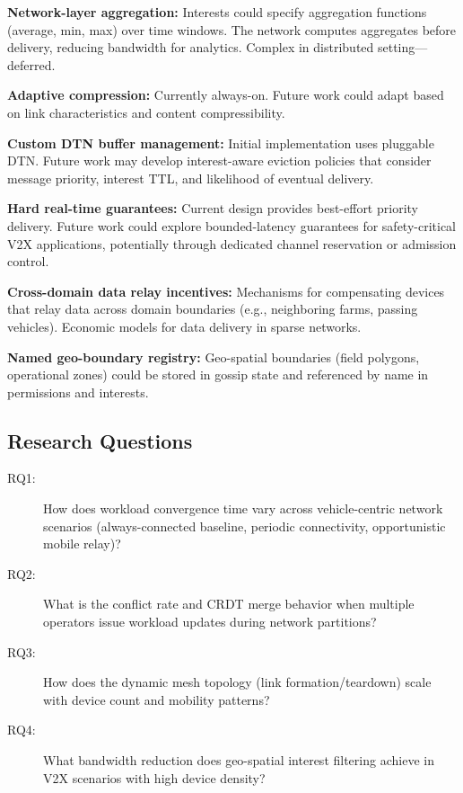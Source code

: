 \textbf{Network-layer aggregation:} Interests could specify aggregation functions (average, min, max) over time windows. The network computes aggregates before delivery, reducing bandwidth for analytics. Complex in distributed setting---deferred.

\textbf{Adaptive compression:} Currently always-on. Future work could adapt based on link characteristics and content compressibility.

\textbf{Custom DTN buffer management:} Initial implementation uses pluggable DTN. Future work may develop interest-aware eviction policies that consider message priority, interest TTL, and likelihood of eventual delivery.

\textbf{Hard real-time guarantees:} Current design provides best-effort priority delivery. Future work could explore bounded-latency guarantees for safety-critical V2X applications, potentially through dedicated channel reservation or admission control.

\textbf{Cross-domain data relay incentives:} Mechanisms for compensating devices that relay data across domain boundaries (e.g., neighboring farms, passing vehicles). Economic models for data delivery in sparse networks.

\textbf{Named geo-boundary registry:} Geo-spatial boundaries (field polygons, operational zones) could be stored in gossip state and referenced by name in permissions and interests.

\subsection{Research Questions}

\begin{description}
    \item[RQ1:] How does workload convergence time vary across vehicle-centric network scenarios (always-connected baseline, periodic connectivity, opportunistic mobile relay)?
    \item[RQ2:] What is the conflict rate and CRDT merge behavior when multiple operators issue workload updates during network partitions?
    \item[RQ3:] How does the dynamic mesh topology (link formation/teardown) scale with device count and mobility patterns?
    \item[RQ4:] What bandwidth reduction does geo-spatial interest filtering achieve in V2X scenarios with high device density?
\end{description}
